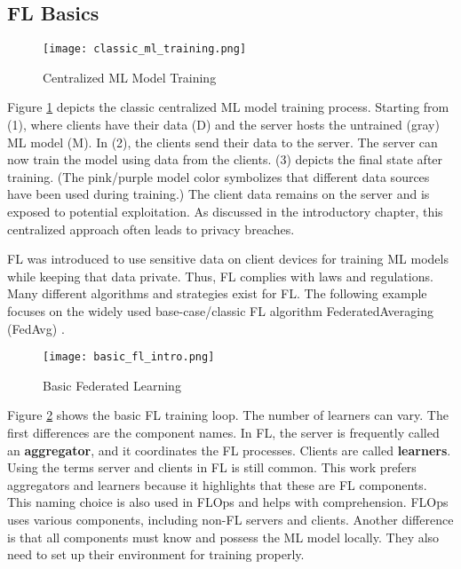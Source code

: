 
\subsection{FL Basics}

\begin{figure}[h]
    \centering
    \texttt{[image: classic\_ml\_training.png]}
    \caption{Centralized ML Model Training}
    \label{fig:classic_ml_training}
\end{figure}
Figure \ref{fig:classic_ml_training} depicts the classic centralized ML model training process.
Starting from (1), where clients have their data (D) and the server hosts the untrained (gray) ML model (M).
In (2), the clients send their data to the server.
The server can now train the model using data from the clients.
(3) depicts the final state after training.
(The pink/purple model color symbolizes that different data sources have been used during training.)
The client data remains on the server and is exposed to potential exploitation.
As discussed in the introductory chapter, this centralized approach often leads to privacy breaches.

FL was introduced to use sensitive data on client devices for training ML models while keeping that data private.
Thus, FL complies with laws and regulations.
Many different algorithms and strategies exist for FL.
The following example focuses on the widely used base-case/classic FL algorithm FederatedAveraging (FedAvg) \cite{paper:original_fl}.

\begin{figure}%
    \centering
    \texttt{[image: basic\_fl\_intro.png]}
    \caption{Basic Federated Learning}
    \label{fig:basic_fl_intro}
\end{figure}
Figure \ref{fig:basic_fl_intro} shows the basic FL training loop.
The number of learners can vary.
The first differences are the component names.
In FL, the server is frequently called an \textbf{aggregator}, and it coordinates the FL processes.
Clients are called \textbf{learners}.
Using the terms server and clients in FL is still common.
This work prefers aggregators and learners because it highlights that these are FL components.
This naming choice is also used in FLOps and helps with comprehension.
FLOps uses various components, including non-FL servers and clients.
Another difference is that all components must know and possess the ML model locally.
They also need to set up their environment for training properly.

